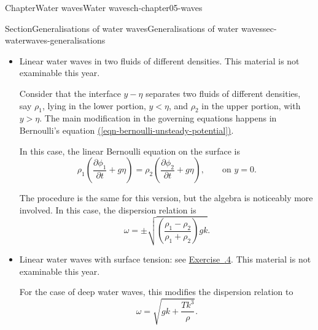 \documentclass[oneside,10pt,]{book}
\newcommand{\xreffont}{\relax}
\newcommand{\ptxlistdisc}{\raisebox{0.3ex}{\textbullet}}
\numberwithin{equation}{section}
\newcommand{\pd}[2]{\frac{\partial#1}{\partial#2}}
\begin{document}
\begin{chapterptx}{Chapter}{Water waves}{}{Water waves}{}{}{ch-chapter05-waves}
\begin{sectionptx}{Section}{Generalisations of water waves}{}{Generalisations of water waves}{}{}{sec-waterwaves-generalisations}
\begin{itemize}[label=\ptxlistdisc]
\par
In these problems, you will modify the setup to include a horizontal current at infinity, with \(\phi \sim Ux\) as \(x \to -\infty\). The main difference in this case is that there are additional terms to be included in the linear kinematic and dynamic conditions. As shown in the exercise, the dispersion relation is modified to%
\begin{equation*}
\omega = \omega_\text{current} = Uk \mp \sqrt{gk \tanh(kh)}.
\end{equation*}
%
\par
There are now two distinct wavespeeds. In the version where there is zero current, \(U = 0\), the wavespeeds reduce to a single one (i.e. a single \(|c|\), with both left- and right-travelling waves; remember that we usually drop the \(\pm\)).%
\item{}Linear water waves in two fluids of different densities. This material is not examinable this year.%
\par
Consider that the interface \(y - \eta\) separates two fluids of different densities, say \(\rho_1\), lying in the lower portion, \(y < \eta\), and \(\rho_2\) in the upper portion, with \(y > \eta\). The main modification in the governing equations happens in Bernoulli's equation \hyperref[eqn-bernoulli-unsteady-potential]{({\xreffont\ref{eqn-bernoulli-unsteady-potential}})}.%
\par
In this case, the linear Bernoulli equation on the surface is%
\begin{equation}
\rho_1\left( \pd{\phi_1}{t} + g\eta\right) = \rho_2\left(\pd{\phi_2}{t} + g\eta\right), \qquad \text{on $y = 0$}.\label{eqn-waterwaves-bernoulli-density}
\end{equation}
%
\par
The procedure is the same for this version, but the algebra is noticeably more involved. In this case, the dispersion relation is%
\begin{equation*}
\omega = \pm \sqrt{\left(\frac{\rho_1 - \rho_2}{\rho_1 + \rho_2}\right) gk}.
\end{equation*}
%
\item{}Linear water waves with surface tension: see \hyperlink{ex-waterwaves-surfacetension}{Exercise~{\xreffont 5.5.4}}. This material is not examinable this year.%
\par
For the case of deep water waves, this modifies the dispersion relation to%
\begin{equation*}
\omega = \sqrt{gk + \frac{Tk^3}{\rho}}.
\end{equation*}

\end{itemize}
\end{sectionptx}
\end{chapterptx}
\end{document}
